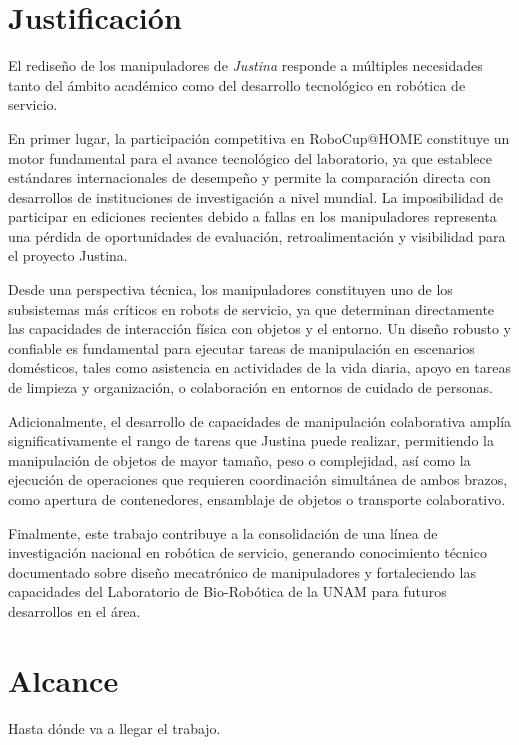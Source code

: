 \section{Justificaci\'on}

El rediseño de los manipuladores de \emph{Justina} responde a múltiples necesidades tanto del ámbito académico como del desarrollo tecnológico en robótica de servicio.

En primer lugar, la participación competitiva en RoboCup@HOME constituye un motor fundamental para el avance tecnológico del laboratorio, ya que establece estándares internacionales de desempeño y permite la comparación directa con desarrollos de instituciones de investigación a nivel mundial. La imposibilidad de participar en ediciones recientes debido a fallas en los manipuladores representa una pérdida de oportunidades de evaluación, retroalimentación y visibilidad para el proyecto Justina.

Desde una perspectiva técnica, los manipuladores constituyen uno de los subsistemas más críticos en robots de servicio, ya que determinan directamente las capacidades de interacción física con objetos y el entorno. Un diseño robusto y confiable es fundamental para ejecutar tareas de manipulación en escenarios domésticos, tales como asistencia en actividades de la vida diaria, apoyo en tareas de limpieza y organización, o colaboración en entornos de cuidado de personas.

Adicionalmente, el desarrollo de capacidades de manipulación colaborativa amplía significativamente el rango de tareas que Justina puede realizar, permitiendo la manipulación de objetos de mayor tamaño, peso o complejidad, así como la ejecución de operaciones que requieren coordinación simultánea de ambos brazos, como apertura de contenedores, ensamblaje de objetos o transporte colaborativo.

Finalmente, este trabajo contribuye a la consolidación de una línea de investigación nacional en robótica de servicio, generando conocimiento técnico documentado sobre diseño mecatrónico de manipuladores y fortaleciendo las capacidades del Laboratorio de Bio-Robótica de la UNAM para futuros desarrollos en el área.

\section{Alcance}

Hasta dónde va a llegar el trabajo.